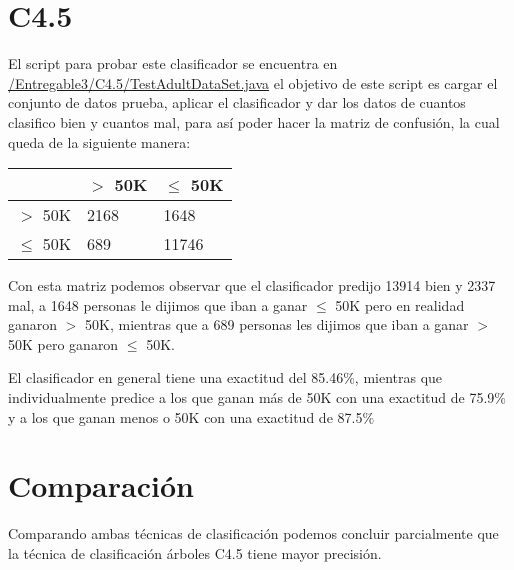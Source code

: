 \documentclass{article}
\begin{document}
 \section{C4.5}
 
 El script para probar este clasificador se encuentra en \href{https://github.com/rodrigorojo/ProyectoFinalMineria/blob/master/Entregable3/NaiveBayes/TestAdultDataSet.java} {/Entregable3/C4.5/TestAdultDataSet.java} el objetivo de este script es cargar el conjunto de datos prueba, aplicar el clasificador y dar los datos de cuantos clasifico bien y cuantos mal, para así poder hacer la matriz de confusión, la cual queda de la siguiente manera:
 \begin{center}
   \begin{tabular}{|p{2cm}|p{2cm}|p{2cm}|}
     \hline
                  & $>$ 50K & $\leq$ 50K  \\ \hline
      $>$ 50K     & 2168    & 1648         \\ \hline
      $\leq$ 50K  & 689    & 11746        \\ \hline
    \end{tabular}
 \end{center}
 Con esta matriz podemos observar que el clasificador predijo 13914 bien y 2337 mal, a 1648 personas le dijimos que iban a ganar $\leq$ 50K pero en realidad ganaron $>$ 50K, mientras que a 689 personas les dijimos que iban a ganar $>$ 50K pero ganaron $\leq$ 50K.
 
 El clasificador en general tiene una exactitud del 85.46$\%$, mientras que individualmente predice a los que ganan más de 50K con una exactitud de 75.9$\%$ y a los que ganan menos o 50K con una exactitud de 87.5$\%$
 \section{Comparación}
 Comparando ambas técnicas de clasificación podemos concluir parcialmente que la técnica de clasificación árboles C4.5 tiene mayor precisión.
 
\end{document}
